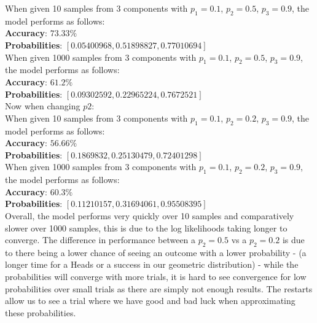 \documentclass[submit]{harvardml}
\begin{document}
\begin{enumerate}
   When given 10 samples from 3 components with $p_1 = 0.1$, $p_2 = 0.5$, $p_3 = 0.9$, the model performs as follows:\\
   \textbf{Accuracy}: $73.33\%$\\
   \textbf{Probabilities}: $[0.05400968, 0.51898827, 0.77010694]$\\
   
   When given 1000 samples from 3 components with $p_1 = 0.1$, $p_2 = 0.5$, $p_3 = 0.9$, the model performs as follows:\\
   \textbf{Accuracy}: $61.2\%$\\
   \textbf{Probabilities}: $[0.09302592, 0.22965224, 0.7672521]$\\
   
   Now when changing $p2$:\\
   When given 10 samples from 3 components with $p_1 = 0.1$, $p_2 = 0.2$, $p_3 = 0.9$, the model performs as follows:\\
   \textbf{Accuracy}: $56.66\%$\\
   \textbf{Probabilities}: $[0.1869832,  0.25130479, 0.72401298]$\\
   
   When given 1000 samples from 3 components with $p_1 = 0.1$, $p_2 = 0.2$, $p_3 = 0.9$, the model performs as follows:\\
   \textbf{Accuracy}: $60.3\%$\\
   \textbf{Probabilities}: $[0.11210157, 0.31694061, 0.95508395]$\\
   
   
   Overall, the model performs very quickly over 10 samples and comparatively slower over 1000 samples, this is due to the log likelihoods taking longer to converge. The difference in performance between a $p_2=0.5$ vs a $p_2=0.2$ is due to there being a lower chance of seeing an outcome with a lower probability - (a longer time for a Heads or a success in our geometric distribution) - while the probabilities will converge with more trials, it is hard to see convergence for low probabilities over small trials as there are simply not enough results. The restarts allow us to see a trial where we have good and bad luck when approximating these probabilities.
\end{enumerate}

\newpage
\end{document}
